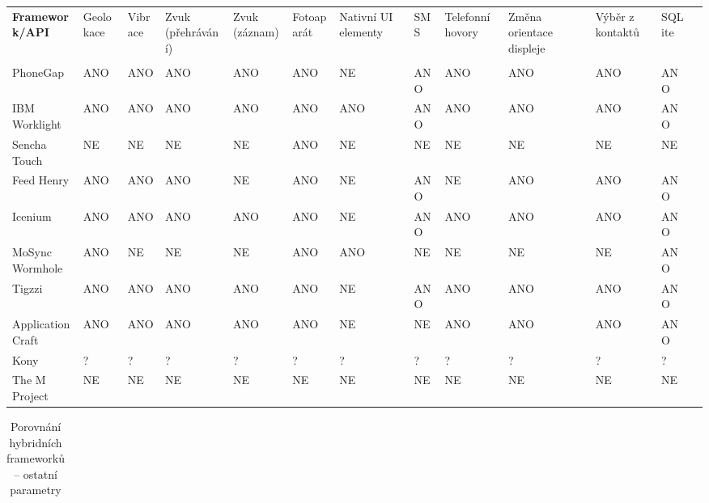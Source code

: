 \documentclass[thesis=B,czech]{FITthesis}[2012/06/26]
\begin{document}
\begin{landscape}
\begin{table}
\begin{tabularx}{21cm}{|p{3.5cm}|X|X|X|X|X|X|X|X|X|X|X|X|}
	\vspace{5 mm} \textbf{Framework/API} & Geo\-lokace & Vibra\-ce & Zvuk (přehrávání) & Zvuk (záznam) & Fotoa\-parát & Nativní UI elementy & SMS & Telefo\-nní hovory & Změna orientace displeje & Výběr z kontaktů & SQLite \\
	\tabularnewline \hline \hline
	PhoneGap & ANO & ANO & ANO & ANO & ANO & NE & ANO & ANO & ANO & ANO & ANO \\
  IBM Worklight & ANO & ANO & ANO & ANO & ANO & ANO & ANO & ANO & ANO & ANO & ANO \\
	Sencha Touch & NE & NE & NE & NE & ANO & NE & NE & NE & NE & NE & NE \\
	Feed Henry & ANO & ANO & ANO & NE & ANO & NE & ANO & NE & ANO & ANO & ANO \\
	Icenium & ANO & ANO & ANO & ANO & ANO & NE & ANO & ANO & ANO & ANO & ANO \\
	MoSync Wormhole & ANO & NE & NE & NE & ANO & ANO & NE & NE & NE & NE & ANO \\
	Tigzzi & ANO & ANO & ANO & ANO & ANO & NE & ANO & ANO & ANO & ANO & ANO \\
	ApplicationCraft & ANO & ANO & ANO & ANO & ANO & NE & NE & ANO & ANO & ANO & ANO \\
	Kony & ? & ? & ? & ? & ? & ? & ? & ? & ? & ? & ? \\
	The M Project & NE & NE & NE & NE & NE & NE & NE & NE & NE & NE & NE \\
    \hline
    \end{tabularx}
\end{table}

\begin{table}
\caption[Porovnání hybridních frameworků – ostatní parametry]{Porovnání hybridních frameworků – ostatní parametry}
	\label{tab:HybridFrameworksOtherComparsion}
\begin{tabularx}{21cm}{|p{4.5cm}|X|X|X|X|X|}
\hline


\end{tabularx}
\end{table}
\end{landscape}
\end{document}
